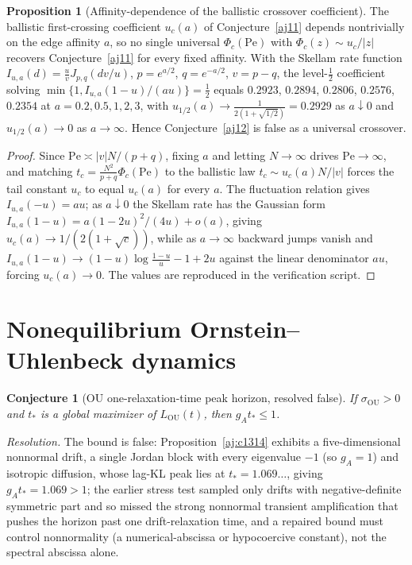 \documentclass[11pt]{article}
\newtheorem{conjecture}{Conjecture}
\theoremstyle{definition}
\newtheorem{proposition}{Proposition}
\begin{document}
\begin{proposition}[Affinity-dependence of the ballistic crossover coefficient]\label{aj:c12}
The ballistic first-crossing coefficient $u_c(a)$ of Conjecture~\ref{aj11} depends nontrivially on the edge affinity $a$, so no single universal $\Phi_c(\mathrm{Pe})$ with $\Phi_c(z)\sim u_c/|z|$ recovers Conjecture~\ref{aj11} for every fixed affinity.  With the Skellam rate function $I_{u,a}(d)=\tfrac uv J_{p,q}(dv/u)$, $p=e^{a/2}$, $q=e^{-a/2}$, $v=p-q$, the level-$\tfrac12$ coefficient solving $\min\{1,I_{u,a}(1-u)/(au)\}=\tfrac12$ equals $0.2923$, $0.2894$, $0.2806$, $0.2576$, $0.2354$ at $a=0.2,0.5,1,2,3$, with $u_{1/2}(a)\to\tfrac1{2(1+\sqrt{1/2})}=0.2929$ as $a\downarrow0$ and $u_{1/2}(a)\to0$ as $a\to\infty$.  Hence Conjecture~\ref{aj12} is false as a universal crossover.
\end{proposition}

\begin{proof}
Since $\mathrm{Pe}\asymp|v|N/(p+q)$, fixing $a$ and letting $N\to\infty$ drives $\mathrm{Pe}\to\infty$, and matching $t_c=\tfrac{N^2}{p+q}\Phi_c(\mathrm{Pe})$ to the ballistic law $t_c\sim u_c(a)N/|v|$ forces the tail constant $u_c$ to equal $u_c(a)$ for every $a$.  The fluctuation relation gives $I_{u,a}(-u)=au$; as $a\downarrow0$ the Skellam rate has the Gaussian form $I_{u,a}(1-u)=a(1-2u)^2/(4u)+o(a)$, giving $u_c(a)\to1/(2(1+\sqrt c))$, while as $a\to\infty$ backward jumps vanish and $I_{u,a}(1-u)\to(1-u)\log\tfrac{1-u}u-1+2u$ against the linear denominator $au$, forcing $u_c(a)\to0$.  The values are reproduced in the verification script.
\end{proof}

\section{Nonequilibrium Ornstein--Uhlenbeck dynamics}

\begin{conjecture}[OU one-relaxation-time peak horizon, resolved false]\label{aj13}
If $\sigma_{\mathrm{OU}}>0$ and $t_*$ is a global maximizer of $L_{\mathrm{OU}}(t)$, then $g_At_*\le1$.
\end{conjecture}

\emph{Resolution.} The bound is false: Proposition~\ref{aj:c1314} exhibits a five-dimensional nonnormal drift, a single Jordan block with every eigenvalue $-1$ (so $g_A=1$) and isotropic diffusion, whose lag-KL peak lies at $t_*=1.069\ldots$, giving $g_At_*=1.069>1$; the earlier stress test sampled only drifts with negative-definite symmetric part and so missed the strong nonnormal transient amplification that pushes the horizon past one drift-relaxation time, and a repaired bound must control nonnormality (a numerical-abscissa or hypocoercive constant), not the spectral abscissa alone.
\end{document}
